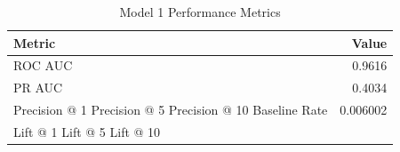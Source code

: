 \begin{table}[h]
\centering
\begin{tabular}{lr}
\toprule
Metric & Value \\
\midrule
ROC AUC & 0.9616 \\
PR AUC & 0.4034 \\
Precision @ 1%
Precision @ 5%
Precision @ 10%
Baseline Rate & 0.006002 \\
Lift @ 1%
Lift @ 5%
Lift @ 10%
\bottomrule
\end{tabular}
\caption{Model 1 Performance Metrics}
\label{tab:model1_metrics}
\end{table}
